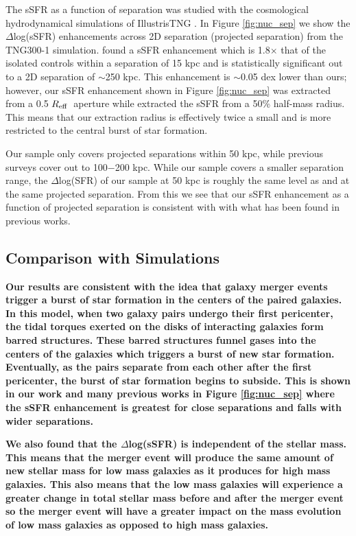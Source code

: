 \documentclass[iop,revtex4,twocolumn,apj,numberedappendix,appendixfloats]{emulateapj}
\newcommand{\reff}{$R_{\rm eff}$}
\begin{document}
The sSFR as a function of separation was studied with the cosmological hydrodynamical simulations of IllustrisTNG \citep{Patton:2020}. In Figure \ref{fig:nuc_sep} we show the $\Delta$log(sSFR) enhancements across 2D separation (projected separation) from the TNG300-1 simulation. \citet{Patton:2020} found a sSFR enhancement which is 1.8$\times$ that of the isolated controls within a separation of 15 kpc and is statistically significant out to a 2D separation of $\sim$250 kpc. This enhancement is $\sim$0.05 dex lower than ours; however, our sSFR enhancement shown in Figure \ref{fig:nuc_sep} was extracted from a 0.5 \reff\ aperture while \citet{Patton:2020} extracted the sSFR from a 50\% half-mass radius. This means that our extraction radius is effectively twice a small and is more restricted to the central burst of star formation. 

Our sample only covers projected separations within 50 kpc, while previous surveys cover out to 100$-$200 kpc. While our sample covers a smaller separation range, the $\Delta$log(SFR) of our sample at 50 kpc is roughly the same level as \citet{Ellison:2008} and \citet{Bustamante:2020} at the same projected separation. From this we see that our sSFR enhancement as a function of projected separation is consistent with with what has been found in previous works. 

\subsection{Comparison with Simulations}

\textbf{
Our results are consistent with the idea that galaxy merger events trigger a burst of star formation in the centers of the paired galaxies. In this model, when two galaxy pairs undergo their first pericenter, the tidal torques exerted on the disks of interacting galaxies form barred structures. These barred structures funnel gases into the centers of the galaxies which triggers a burst of new star formation. Eventually, as the pairs separate from each other after the first pericenter, the burst of star formation begins to subside. This is shown in our work and many previous works in Figure \ref{fig:nuc_sep} where the sSFR enhancement is greatest for close separations and falls with wider separations. 
}

\textbf{
We also found that the $\Delta$log(sSFR) is independent of the stellar mass. This means that the merger event will produce the same amount of new stellar mass for low mass galaxies as it produces for high mass galaxies. This also means that the low mass galaxies will experience a greater change in total stellar mass before and after the merger event so the merger event will have a greater impact on the mass evolution of low mass galaxies as opposed to high mass galaxies.
}
\end{document}
